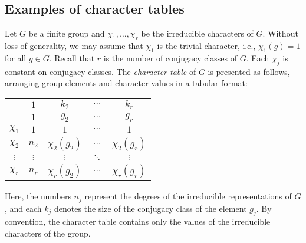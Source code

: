 \subsection{Examples of character tables}

Let $G$ be a finite group and $\chi_1,\dots,\chi_r$ be the irreducible characters of $G$. Without loss of generality, 
we may assume that $\chi_1$ is the trivial character, i.e.,  $\chi_1(g)=1$ for all $g\in G$. 
Recall that $r$ is the number of conjugacy classes of $G$. Each $\chi_j$ is constant on conjugacy classes. 
The \emph{character table} of $G$ is presented as follows, arranging group elements and character values in a tabular format:
\bigskip 
\begin{center}
\begin{tabular}{|c|cccc|}
\hline 
 & $1$ & $k_{2}$ & $\cdots$ & $k_{r}$\tabularnewline
 & $1$ & $g_{2}$ & $\cdots$ & $g_{r}$\tabularnewline
\hline 
$\chi_{1}$ & $1$ & $1$ & $\cdots$ & $1$\tabularnewline
$\chi_{2}$ & $n_{2}$ & $\chi_{2}(g_{2})$ & $\cdots$ & $\chi_{2}(g_{r})$\tabularnewline
$\vdots$ & $\vdots$ & $\vdots$ & $\ddots$ & $\vdots$\tabularnewline
$\chi_{r}$ & $n_{r}$ & $\chi_{r}(g_{2})$ & $\cdots$ & $\chi_{r}(g_{r})$\tabularnewline
\hline
\end{tabular}
\end{center}
\bigskip 
Here, the numbers $n_j$ represent the degrees of the irreducible representations of $G$, and each $k_j$ denotes  
the size of the conjugacy class of the element $g_j$. By convention, the character table
contains only the values of the irreducible characters of the group. 

